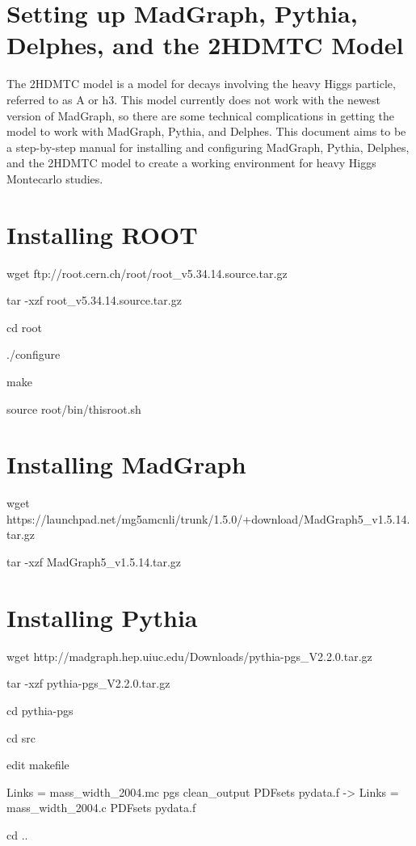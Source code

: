 \documentclass{article}
\begin{document}
\section*{Setting up MadGraph, Pythia, Delphes, and the 2HDMTC Model}

The 2HDMTC model is a model for decays involving the heavy Higgs particle, referred to as A or h3. This model currently does not work with the newest version of MadGraph, so there are some technical complications in getting the model to work with MadGraph, Pythia, and Delphes. This document aims to be a step-by-step manual for installing and configuring MadGraph, Pythia, Delphes, and the 2HDMTC model to create a working environment for heavy Higgs Montecarlo studies.

\section{Installing ROOT}

wget ftp://root.cern.ch/root/root\_v5.34.14.source.tar.gz

tar -xzf root\_v5.34.14.source.tar.gz

cd root

./configure

make

source root/bin/thisroot.sh

\section{Installing MadGraph}

wget https://launchpad.net/mg5amcnli/trunk/1.5.0/+download/MadGraph5\_v1.5.14.tar.gz

tar -xzf MadGraph5\_v1.5.14.tar.gz

\section {Installing Pythia}

wget http://madgraph.hep.uiuc.edu/Downloads/pythia-pgs\_V2.2.0.tar.gz

tar -xzf pythia-pgs\_V2.2.0.tar.gz

cd pythia-pgs

cd src

edit makefile

Links = mass\_width\_2004.mc pgs clean\_output PDFsets pydata.f -> Links = mass\_width\_2004.c PDFsets pydata.f

cd ..
\end{document}
